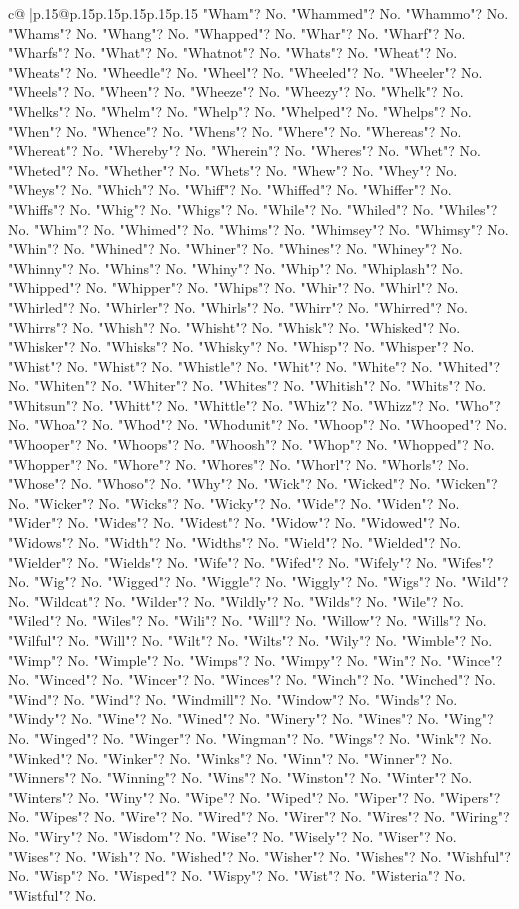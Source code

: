\documentclass{article}
\begin{document}
{\begin{supertabular}{c@{$\;$}|p{.15\linewidth}@{}p{.15\linewidth}p{.15\linewidth}p{.15\linewidth}p{.15\linewidth}p{.15\linewidth}}
{{{"Wham"? No. "Whammed"? No. "Whammo"? No. "Whams"? No. "Whang"? No. "Whapped"? No. "Whar"? No. "Wharf"? No. "Wharfs"? No. "What"? No. "Whatnot"? No. "Whats"? No. "Wheat"? No. "Wheats"? No. "Wheedle"? No. "Wheel"? No. "Wheeled"? No. "Wheeler"? No. "Wheels"? No. "Wheen"? No. "Wheeze"? No. "Wheezy"? No. "Whelk"? No. "Whelks"? No. "Whelm"? No. "Whelp"? No. "Whelped"? No. "Whelps"? No. "When"? No. "Whence"? No. "Whens"? No. "Where"? No. "Whereas"? No. "Whereat"? No. "Whereby"? No. "Wherein"? No. "Wheres"? No. "Whet"? No. "Wheted"? No. "Whether"? No. "Whets"? No. "Whew"? No. "Whey"? No. "Wheys"? No. "Which"? No. "Whiff"? No. "Whiffed"? No. "Whiffer"? No. "Whiffs"? No. "Whig"? No. "Whigs"? No. "While"? No. "Whiled"? No. "Whiles"? No. "Whim"? No. "Whimed"? No. "Whims"? No. "Whimsey"? No. "Whimsy"? No. "Whin"? No. "Whined"? No. "Whiner"? No. "Whines"? No. "Whiney"? No. "Whinny"? No. "Whins"? No. "Whiny"? No. "Whip"? No. "Whiplash"? No. "Whipped"? No. "Whipper"? No. "Whips"? No. "Whir"? No. "Whirl"? No. "Whirled"? No. "Whirler"? No. "Whirls"? No. "Whirr"? No. "Whirred"? No. "Whirrs"? No. "Whish"? No. "Whisht"? No. "Whisk"? No. "Whisked"? No. "Whisker"? No. "Whisks"? No. "Whisky"? No. "Whisp"? No. "Whisper"? No. "Whist"? No. "Whist"? No. "Whistle"? No. "Whit"? No. "White"? No. "Whited"? No. "Whiten"? No. "Whiter"? No. "Whites"? No. "Whitish"? No. "Whits"? No. "Whitsun"? No. "Whitt"? No. "Whittle"? No. "Whiz"? No. "Whizz"? No. "Who"? No. "Whoa"? No. "Whod"? No. "Whodunit"? No. "Whoop"? No. "Whooped"? No. "Whooper"? No. "Whoops"? No. "Whoosh"? No. "Whop"? No. "Whopped"? No. "Whopper"? No. "Whore"? No. "Whores"? No. "Whorl"? No. "Whorls"? No. "Whose"? No. "Whoso"? No. "Why"? No. "Wick"? No. "Wicked"? No. "Wicken"? No. "Wicker"? No. "Wicks"? No. "Wicky"? No. "Wide"? No. "Widen"? No. "Wider"? No. "Wides"? No. "Widest"? No. "Widow"? No. "Widowed"? No. "Widows"? No. "Width"? No. "Widths"? No. "Wield"? No. "Wielded"? No. "Wielder"? No. "Wields"? No. "Wife"? No. "Wifed"? No. "Wifely"? No. "Wifes"? No. "Wig"? No. "Wigged"? No. "Wiggle"? No. "Wiggly"? No. "Wigs"? No. "Wild"? No. "Wildcat"? No. "Wilder"? No. "Wildly"? No. "Wilds"? No. "Wile"? No. "Wiled"? No. "Wiles"? No. "Wili"? No. "Will"? No. "Willow"? No. "Wills"? No. "Wilful"? No. "Will"? No. "Wilt"? No. "Wilts"? No. "Wily"? No. "Wimble"? No. "Wimp"? No. "Wimple"? No. "Wimps"? No. "Wimpy"? No. "Win"? No. "Wince"? No. "Winced"? No. "Wincer"? No. "Winces"? No. "Winch"? No. "Winched"? No. "Wind"? No. "Wind"? No. "Windmill"? No. "Window"? No. "Winds"? No. "Windy"? No. "Wine"? No. "Wined"? No. "Winery"? No. "Wines"? No. "Wing"? No. "Winged"? No. "Winger"? No. "Wingman"? No. "Wings"? No. "Wink"? No. "Winked"? No. "Winker"? No. "Winks"? No. "Winn"? No. "Winner"? No. "Winners"? No. "Winning"? No. "Wins"? No. "Winston"? No. "Winter"? No. "Winters"? No. "Winy"? No. "Wipe"? No. "Wiped"? No. "Wiper"? No. "Wipers"? No. "Wipes"? No. "Wire"? No. "Wired"? No. "Wirer"? No. "Wires"? No. "Wiring"? No. "Wiry"? No. "Wisdom"? No. "Wise"? No. "Wisely"? No. "Wiser"? No. "Wises"? No. "Wish"? No. "Wished"? No. "Wisher"? No. "Wishes"? No. "Wishful"? No. "Wisp"? No. "Wisped"? No. "Wispy"? No. "Wist"? No. "Wisteria"? No. "Wistful"? No. }}}
\end{supertabular}}
\end{document}

